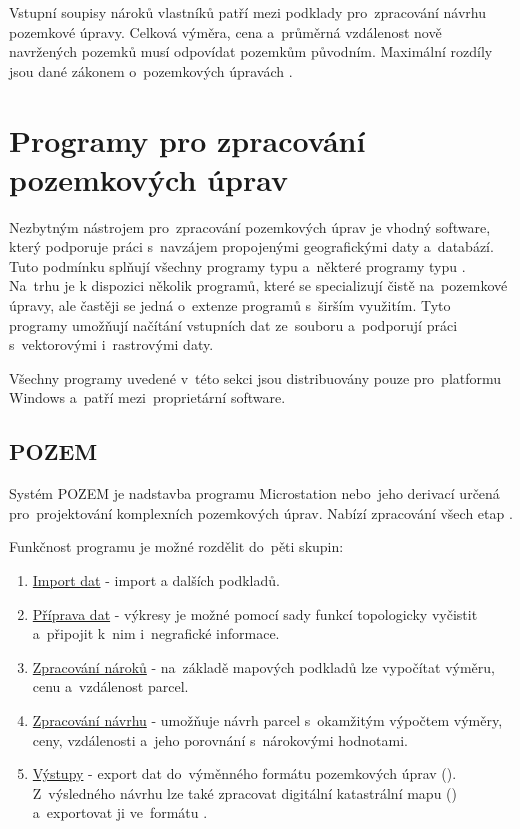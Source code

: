 Vstupní soupisy nároků vlastníků patří mezi podklady pro~zpracování návrhu pozemkové úpravy. Celková výměra, cena a~průměrná vzdálenost nově navržených pozemků musí odpovídat pozemkům původním. Maximální rozdíly jsou dané zákonem o~pozemkových úpravách \citep{pu_zakon}.

\section{Programy pro zpracování pozemkových úprav}
\label{programy_pu}

Nezbytným nástrojem pro~zpracování pozemkových úprav je vhodný software, který podporuje práci s~navzájem propojenými geografickými daty a~databází. Tuto podmínku splňují všechny programy typu  a~některé programy typu . Na~trhu je k dispozici několik programů, které se specializují čistě na~pozemkové úpravy, ale častěji se jedná o~extenze programů s~širším využitím. Tyto programy umožňují načítání vstupních dat ze~souboru  a~podporují práci s~vektorovými i~rastrovými daty.

Všechny programy uvedené v~této sekci jsou distribuovány pouze pro~platformu Windows a~patří mezi~proprietární software.

\subsection{POZEM}
\label{pozem}

Systém POZEM je nadstavba programu Microstation nebo~jeho derivací určená pro~projektování komplexních pozemkových úprav. Nabízí zpracování všech etap .

Funkčnost programu je možné rozdělit do~pěti skupin:
	\begin{enumerate}[leftmargin=1.5cm, noitemsep]
		\item \underline{Import dat} - import  a dalších podkladů.
		\item \underline{Příprava dat} - výkresy je možné pomocí sady funkcí topologicky vyčistit a~připojit k~nim i~negrafické informace.
		\item \underline{Zpracování nároků} - na~základě mapových podkladů lze vypočítat výměru, cenu a~vzdálenost parcel. 
		\item \underline{Zpracování návrhu} - umožňuje návrh parcel s~okamžitým výpočtem výměry, ceny, vzdálenosti a~jeho porovnání s~nárokovými hodnotami.
		\item \underline{Výstupy} - export dat do~výměnného formátu pozemkových úprav (). Z~výsledného návrhu lze také zpracovat digitální katastrální mapu () a~exportovat ji ve~formátu .
	\end{enumerate}


